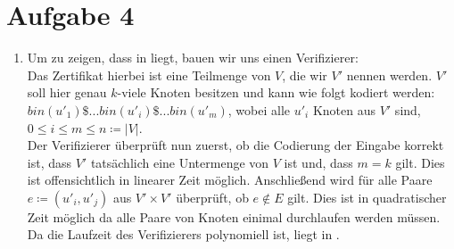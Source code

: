 \documentclass[a4paper,11pt]{scrartcl}
\begin{document}
	\section*{Aufgabe 4}
	\begin{enumerate}[label=\alph*)]
	\item	Um zu zeigen, dass  in  liegt, bauen wir uns einen Verifizierer:\\
		Das Zertifikat hierbei ist eine Teilmenge von $V$, die wir $V'$ nennen werden. $V'$ soll hier genau $k$-viele Knoten besitzen und kann wie folgt kodiert werden:\\
		$bin(u'_1)\$...bin(u'_i)\$...bin(u'_m)$, wobei alle $u'_i$ Knoten aus $V'$ sind, $0\leq i \leq m \leq n \coloneqq \vert V \vert$.\\
		Der Verifizierer überprüft nun zuerst, ob die Codierung der Eingabe korrekt ist, dass $V'$ tatsächlich eine Untermenge von $V$ ist und, dass $m = k$ gilt. Dies ist offensichtlich in linearer Zeit möglich. Anschließend wird für alle Paare $e \coloneqq (u'_i, u'_j)$ aus $V' \times V'$ überprüft, ob $e \not\in E$ gilt. Dies ist in quadratischer Zeit möglich da alle Paare von Knoten einimal durchlaufen werden müssen.\\
	Da die Laufzeit des Verifizierers polynomiell ist, liegt  in \NP.
	

\end{enumerate}
\end{document}
